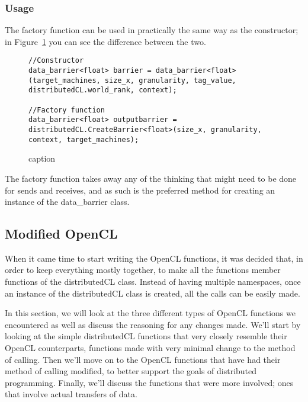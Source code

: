 \documentclass[../thesis.tex]{subfiles}
\begin{document}
    \subsubsection{Usage} %
    \label{ssub:usage}
        The factory function can be used in practically the same way as the constructor; in Figure~\ref{fig:constructor_vs_factory} you can see the difference between the two.

        \begin{figure}[htbp]
            \centering
            \lstset{language=cpp}
            \begin{lstlisting}[tabsize=2]
//Constructor
data_barrier<float> barrier = data_barrier<float>(target_machines, size_x, granularity, tag_value, distributedCL.world_rank, context);

//Factory function
data_barrier<float> outputbarrier = distributedCL.CreateBarrier<float>(size_x, granularity, context, target_machines);
            \end{lstlisting}
            \caption{caption}
            \label{fig:constructor_vs_factory}
        \end{figure}

    The factory function takes away any of the thinking that might need to be done for sends and receives, and as such is the preferred method for creating an instance of the data\_barrier class.


\subsection{Modified OpenCL} %
\label{sub:modified_opencl}
    When it came time to start writing the OpenCL functions, it was decided that, in order to keep everything mostly together, to make all the functions member functions of the distributedCL class. Instead of having multiple namespaces, once an instance of the distributedCL class is created, all the calls can be easily made.

    In this section, we will look at the three different types of OpenCL functions we encountered as well as discuss the reasoning for any changes made. We'll start by looking at the simple distributedCL functions that very closely resemble their OpenCL counterparts, functions made with very minimal change to the method of calling. Then we'll move on to the OpenCL functions that have had their method of calling modified, to better support the goals of distributed programming. Finally, we'll discuss the functions that were more involved; ones that involve actual transfers of data.
\end{document}
